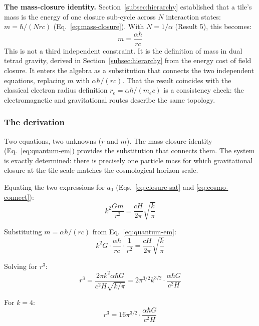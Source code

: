 \documentclass[aps,prd,preprint,superscriptaddress,showpacs,preprintnumbers,amsmath,amssymb,nofootinbib]{revtex4-2}
\begin{document}
\textbf{The mass-closure identity.} Section~\ref{subsec:hierarchy} established that a tile's mass is the energy of one closure sub-cycle across $N$ interaction states: $m = \hbar/(Nrc)$ (Eq.~\ref{eq:mass-closure}). With $N = 1/\alpha$ (Result 5), this becomes:
\begin{equation}
m = \frac{\alpha \hbar}{rc}
\label{eq:quantum-em}
\end{equation}
This is not a third independent constraint. It is the definition of mass in dual tetrad gravity, derived in Section~\ref{subsec:hierarchy} from the energy cost of field closure. It enters the algebra as a substitution that connects the two independent equations, replacing $m$ with $\alpha\hbar/(rc)$. That the result coincides with the classical electron radius definition $r_e = \alpha\hbar/(m_e c)$ is a consistency check: the electromagnetic and gravitational routes describe the same topology.

\subsubsection*{The derivation}

Two equations, two unknowns ($r$ and $m$). The mass-closure identity (Eq.~\ref{eq:quantum-em}) provides the substitution that connects them. The system is exactly determined: there is precisely one particle mass for which gravitational closure at the tile scale matches the cosmological horizon scale.

Equating the two expressions for $a_0$ (Eqs.~\ref{eq:closure-sat} and \ref{eq:cosmo-connect}):
\begin{equation}
k^2 \frac{Gm}{r^2} = \frac{cH}{2\pi} \sqrt{\frac{k}{\pi}}
\end{equation}

Substituting $m = \alpha\hbar/(rc)$ from Eq.~\ref{eq:quantum-em}:
\begin{equation}
k^2 G \cdot \frac{\alpha\hbar}{rc} \cdot \frac{1}{r^2} = \frac{cH}{2\pi} \sqrt{\frac{k}{\pi}}
\end{equation}

Solving for $r^3$:
\begin{equation}
r^3 = \frac{2\pi k^2 \alpha \hbar G}{c^2 H \sqrt{k/\pi}} = 2\pi^{3/2} k^{3/2} \cdot \frac{\alpha \hbar G}{c^2 H}
\label{eq:r-cubed}
\end{equation}

For $k = 4$:
\begin{equation}
r^3 = 16 \pi^{3/2} \cdot \frac{\alpha \hbar G}{c^2 H}
\end{equation}
\end{document}
